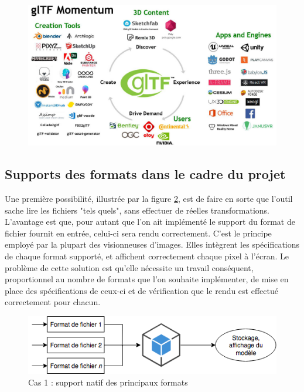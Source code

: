 \begin{figure}
    \centering
    \includegraphics[width=0.8\linewidth]{Figures/gltf-momentum.jpg}
    \label{fig:gltf-momentum}
\end{figure}

\subsection{Supports des formats dans le cadre du projet}

Une première possibilité, illustrée par la figure \ref{fig:file-importation-process-native}, est de faire en sorte que l'outil sache lire les fichiers "tels quels", sans effectuer de réelles transformations.
L'avantage est que, pour autant que l'on ait implémenté le support du format de fichier fournit en entrée, celui-ci sera rendu correctement. C'est le principe employé par la plupart des visionneuses d'images. Elles intègrent les spécifications de chaque format supporté, et affichent correctement chaque pixel à l'écran.
Le problème de cette solution est qu'elle nécessite un travail conséquent, proportionnel au nombre de formats que l'on souhaite implémenter, de mise en place des spécifications de ceux-ci et de vérification que le rendu est effectué correctement pour chacun.

\begin{figure}[ht]
    \centering
    \includegraphics[width=0.7\linewidth]{Figures/file-importation-process-native.png}
    \caption{Cas 1 : support natif des principaux formats}
    \label{fig:file-importation-process-native}
\end{figure}

